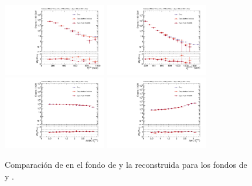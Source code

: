 \begin{figure}
  \centering
  \includegraphics[width=0.4\textwidth]{images/analysis_EWK/ZnunugCutS_100_vs_ZllgCutS_100_v192_0_met_et.pdf}
  \includegraphics[width=0.4\textwidth]{images/analysis_EWK/ZnunugCutS_100_vs_ZllgCutS_100_v192_0_ph_pt0.pdf}
  \includegraphics[width=0.4\textwidth]{images/analysis_EWK/ZnunugCutS_100_vs_ZllgCutS_100_v192_0_dphi_jetmet.pdf}
  \includegraphics[width=0.4\textwidth]{images/analysis_EWK/ZnunugCutS_100_vs_ZllgCutS_100_v192_0_dphi_gammet.pdf}
  \caption{Comparación de \met en el fondo de \znunuph y la reconstruida para los fondos de \zeeph y \zmumuph.}
  \label{fig:met_inv}
\end{figure}

